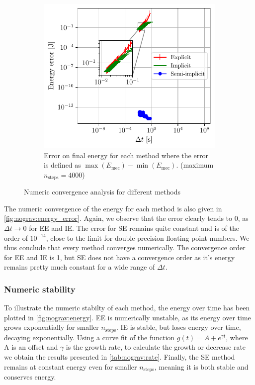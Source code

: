 \begin{figure}[h]
\begin{subfigure}{0.45\linewidth}
        \includegraphics[width=\linewidth]{figures/nograv_energy_error_all.pdf}
        \caption{Error on final energy for each method where the error is defined as $\max(E_\textrm{mec}) - \min(E_\textrm{mec}).$ (maximum $n_\textrm{steps}=4000$)}
        \label{fig:nograv:energy_error}
    \end{subfigure}
    \caption{Numeric convergence analysis for different methods}
\end{figure}

The numeric convergence of the energy for each method is also given in \autoref{fig:nograv:energy_error}. Again, we observe that the error clearly tends to 0, as $\Delta t \rightarrow 0$ for EE and IE. The error for SE remains quite constant and is of the order of $10^{-14}$, close to the limit for double-precision floating point numbers. We thus conclude that every method converges numerically. The convergence order for EE and IE is 1, but SE does not have a convergence order as it's energy remains pretty much constant for a wide range of $\Delta t$.

\subsubsection{Numeric stability}

To illustrate the numeric stabilty of each method, the energy over time has been plotted in \autoref{fig:nograv:energy}. EE is numerically unstable, as its energy over time grows exponentially for smaller $n_\textrm{steps}$. IE is stable, but loses energy over time, decaying exponentially. Using a curve fit of the function $g(t) = A + e^{\gamma t}$, where A is an offset and $\gamma$ is the growth rate, to calculate the growth or decrease rate we obtain the results presented in \autoref{tab:nograv:rate}. Finally, the SE method remains at constant energy even for smaller $n_\textrm{steps}$, meaning it is both stable and conserves energy.

